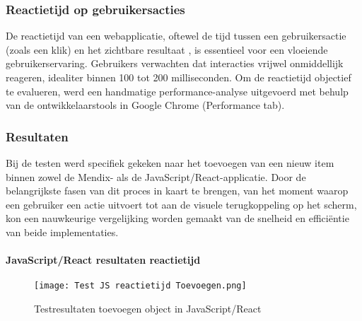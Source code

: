\subsubsection{Reactietijd op gebruikersacties}
De reactietijd van een webapplicatie, oftewel de tijd tussen een gebruikersactie (zoals een klik) en het zichtbare resultaat , is essentieel voor een vloeiende gebruikerservaring. Gebruikers verwachten dat interacties vrijwel onmiddellijk reageren, idealiter binnen 100 tot 200 milliseconden. Om de reactietijd objectief te evalueren, werd een handmatige performance-analyse uitgevoerd met behulp van de ontwikkelaarstools in Google Chrome (Performance tab). 

\subsubsection{Resultaten}
Bij de testen werd specifiek gekeken naar het toevoegen van een nieuw item binnen zowel de Mendix- als de JavaScript/React-applicatie. Door de belangrijkste fasen van dit proces in kaart te brengen, van het moment waarop een gebruiker een actie uitvoert tot aan de visuele terugkoppeling op het scherm, kon een nauwkeurige vergelijking worden gemaakt van de snelheid en efficiëntie van beide implementaties.

\paragraph{JavaScript/React resultaten reactietijd}

\begin{figure}[H]
    \centering
    \texttt{[image: Test JS reactietijd Toevoegen.png]}
    \caption[Testresultaten toevoegen object in JavaScript/React]{\label{fig:reactietijd-JavaScript} Testresultaten toevoegen object in JavaScript/React }
\end{figure}


